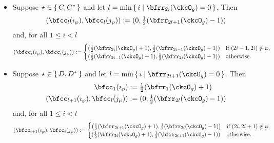 \documentclass[12pt,a4paper]{amsart}
\numberwithin{equation}{section}
\theoremstyle{remark}
\def\half{{\tfrac{1}{2}}}
\def\imathp{\imath_{\sP}}
\def\jmathp{\jmath_{\sP}}
\def\sP{\wp}
\begin{document}
  \begin{itemize}
    \item Suppose $\star\in \set{C,C^{*}}$ and let
          $l=\min\set{i| \bfrr_{2i}(\ckcO_{g})=0}$. Then
          \[
          (\bfcc_{l}(\imathp), \bfcc_{l}(\jmathp)) := (0,\half(\bfrr_{2l+1}(\ckcO_{g})-1))
          \]
          and, for all $1\leq i< l$
          \[
          (\bfcc_{i}(\imathp), \bfcc_{i}(\jmathp)):=
          \begin{cases}
            (\half (\bfrr_{2i}(\ckcO_{g})+1), \half (\bfrr_{2i-1}(\ckcO_{g})-1))
            & \text{if } (2i-1,2i)\notin \wp,\\
            (\half (\bfrr_{2i-1}(\ckcO_{g})+1),\half (\bfrr_{2i}(\ckcO_{g})-1)) & \text{otherwise.}
          \end{cases}
          \]
    \item Suppose $\star\in \set{D,D^{*}}$ and let
          $l=\min\set{i| \bfrr_{2i+1}(\ckcO_{g})=0}$. Then
          \[
          \begin{split}
            \bfcc_{1}(\imathp) &:=
            \half(\bfrr_{1}(\ckcO_{g})+1)\\
            (\bfcc_{l+1}(\imathp), \bfcc_{l}(\jmathp)) &:= (0,\half(\bfrr_{2l}(\ckcO_{g})-1))
          \end{split}
          \]
          and, for all $1\leq i<l$
          \[
          (\bfcc_{i+1}(\imathp), \bfcc_{i}(\jmathp)):=
          \begin{cases}
            \left(\half (\bfrr_{2i+1}(\ckcO_{g})+1), \half (\bfrr_{2i}(\ckcO_{g})-1)\right)
            & \text{if } (2i,2i+1)\notin \wp,\\
            (\half (\bfrr_{2i}(\ckcO_{g})+1),\half (\bfrr_{2i+1}(\ckcO_{g})-1)) & \text{otherwise.}
          \end{cases}
          \]


\end{itemize}
\end{document}
